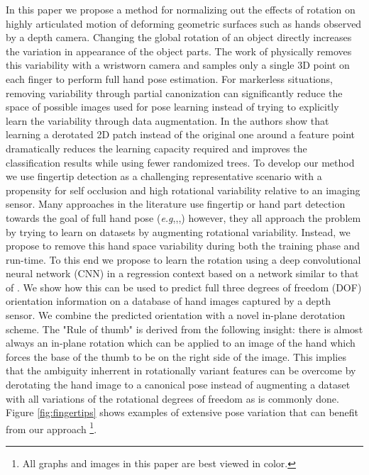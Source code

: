 \documentclass{bmvc2k}
\def\eg{\emph{e.g}\bmvaOneDot}
\begin{document}
In this paper we propose a method for normalizing out 
the effects of rotation on highly articulated motion of deforming geometric surfaces such as 
hands observed by a depth camera. Changing the global rotation of an object directly increases the variation in appearance of the object parts. The work of \cite{KimHIBCOO12} 
physically removes this variability with a wristworn camera and samples only a single 3D point on 
each finger to perform full hand pose estimation. For markerless situations, removing variability 
through partial canonization can significantly reduce the space of possible images used for pose 
learning instead of trying to explicitly learn the variability through data augmentation. In 
\cite{LepetitLF05} the authors show that learning a derotated 2D patch instead of the original one 
around a feature point dramatically reduces the learning capacity required and improves the 
classification results while using fewer randomized trees. To develop our method we use fingertip 
detection as a challenging representative scenario with a propensity for self occlusion and high 
rotational variability relative to an imaging sensor. Many approaches in the literature use fingertip 
or hand part detection towards the goal of full 
hand pose (\eg \cite{KeskinKKA11},\cite{qian2014realtime},\cite{tompson14tog},\cite{Wang09}) 
however, they all approach the problem by trying to learn on datasets by augmenting rotational variability. 
Instead, we propose to remove  this hand space variability during both the training phase and run-time. To this end we propose to learn the rotation using a deep convolutional neural network (CNN) in a regression context based on a network similar to that of \cite{tompson14tog}. We show how this can be used to predict full three degrees of freedom (DOF) orientation information on a 
database of hand images captured by a depth sensor. We combine the 
predicted orientation with a novel in-plane derotation scheme. The "Rule of thumb" is derived from the following insight: there is almost always an in-plane rotation which 
can be applied to an image of the hand which forces the base of the thumb to be on the right side of 
the image. This implies that the ambiguity inherrent in rotationally variant features can be overcome 
by derotating the hand image to a canonical pose instead of augmenting a dataset with all variations 
of the rotational degrees of freedom as is commonly done. Figure \ref{fig:fingertips} shows examples of extensive
pose variation that can benefit from our approach \footnote{All graphs and images in this paper are best viewed in color.}. 
\end{document}
